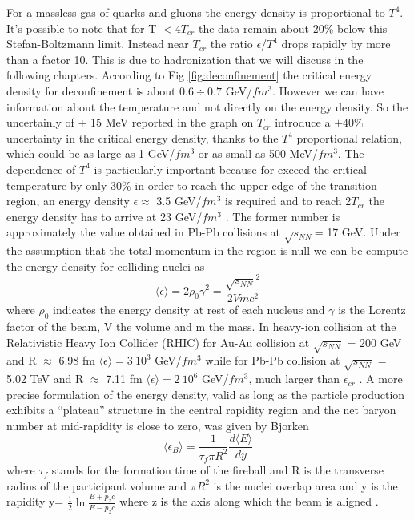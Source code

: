 \documentclass[12pt,a4paper]{book}
\begin{document}
	For a massless gas of quarks and gluons the energy density is proportional to $T^4$.  It's possible to note that for T $ <4T_{cr}$ the data remain about 20\% below this Stefan-Boltzmann limit. Instead near $T_{cr}$ the ratio $\epsilon$/$T^4$ drops rapidly by more than a factor 10. This is due to hadronization that we will discuss in the following chapters. According to Fig \ref{fig:deconfinement} the critical energy density for deconfinement is about $0.6 \div 0.7$ GeV/$fm^3$. However we can have information about the temperature and not directly on the energy density. So the uncertainly of $\pm$ 15 MeV reported in the graph on $T_{cr}$ introduce a $\pm 40 \%$ uncertainty in the critical energy density, thanks to the $T^4$ proportional relation, which could be as large as 1 GeV/$fm^3$ or as small as 500 MeV/$fm^3$. The dependence of $T^4$ is particularly important because for exceed the critical temperature by only 30\% in order to reach the upper edge of the transition region, an energy density $\epsilon \approx$  3.5 GeV/$fm^3$ is required and to reach 2$T_{cr}$ the energy density has to arrive at 23 GeV/$fm^3$ \cite{heinz2004conceptsheavyionphysics}. The former number is approximately the value obtained in Pb-Pb collisions at $\sqrt{s_{NN}}$= 17 GeV. Under the assumption that the total momentum in the region is null we can be compute the energy density for colliding nuclei as
	\begin{equation}
		\langle \epsilon \rangle = 2 \rho_0 \gamma^2 = \frac{\sqrt{s_{NN}}^2}{2 V mc^2}
	\end{equation} 
	where $\rho_0$  indicates the energy density at rest of each nucleus and $\gamma$ is the Lorentz factor of the beam, V the volume and m the mass. In heavy-ion collision at the Relativistic Heavy Ion Collider (RHIC) for Au-Au collision at $\sqrt{s_{NN}}$ = 200 GeV and R $\approx$ 6.98 fm $\langle \epsilon \rangle = 3 \  10^3$ GeV/$fm^3$ while for Pb-Pb collision at $\sqrt{s_{NN}}$ = 5.02 TeV and R $\approx$ 7.11 fm $\langle \epsilon \rangle = 2 \  10^6$ GeV/$fm^3$, much larger than $\epsilon_{cr}$ \cite{Acharya_2024} . A more precise formulation of the energy density, valid as long as the particle production exhibits a “plateau” structure in the central rapidity region and the net baryon number at mid-rapidity is close to zero, was given by Bjorken \cite{PhysRevD.27.140}
	\begin{equation}
		\langle \epsilon_B \rangle = \frac{1}{\tau_f \pi R^2} \frac{d \langle E \rangle}{dy}
	\end{equation}
	where $\tau_f$ stands for the formation time of the fireball and R is the transverse radius of the participant volume and $\pi R^2$ is the nuclei overlap area and y is the rapidity y= $\frac{1}{2} \ln \frac{E+ p_z c} {E - p_z c}$ where z is the axis along which the beam is aligned \cite{amsdottorato9036}. 
	
\end{document}
